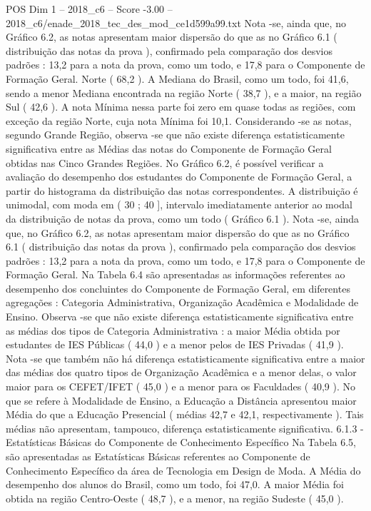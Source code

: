 \begin{textsample}{POS Dim 1 – 2018\_c6 – Score -3.00 – 2018\_c6/enade\_2018\_tec\_des\_mod\_ce1d599a99.txt}
Nota -se, ainda que, no Gráfico 6.2, as notas apresentam maior dispersão do que as no Gráfico 6.1 ( distribuição das notas da prova ), confirmado pela comparação dos desvios padrões : 13,2 para a nota da prova, como um todo, e 17,8 para o Componente de Formação Geral.
Norte ( 68,2 ).
A Mediana do Brasil, como um todo, foi 41,6, sendo a menor Mediana encontrada na região Norte ( 38,7 ), e a maior, na região Sul ( 42,6 ).
A nota Mínima nessa parte foi zero em quase todas as regiões, com exceção da região Norte, cuja nota Mínima foi 10,1.
Considerando -se as notas, segundo Grande Região, observa -se que não existe diferença estatisticamente significativa entre as Médias das notas do Componente de Formação Geral obtidas nas Cinco Grandes Regiões.
No Gráfico 6.2, é possível verificar a avaliação do desempenho dos estudantes do Componente de Formação Geral, a partir do histograma da distribuição das notas correspondentes.
A distribuição é unimodal, com moda em ( 30 ; 40 ], intervalo imediatamente anterior ao modal da distribuição de notas da prova, como um todo ( Gráfico 6.1 ).
Nota -se, ainda que, no Gráfico 6.2, as notas apresentam maior dispersão do que as no Gráfico 6.1 ( distribuição das notas da prova ), confirmado pela comparação dos desvios padrões : 13,2 para a nota da prova, como um todo, e 17,8 para o Componente de Formação Geral.
Na Tabela 6.4 são apresentadas as informações referentes ao desempenho dos concluintes do Componente de Formação Geral, em diferentes agregações : Categoria Administrativa, Organização Acadêmica e Modalidade de Ensino.
Observa -se que não existe diferença estatisticamente significativa entre as médias dos tipos de Categoria Administrativa : a maior Média obtida por estudantes de IES Públicas ( 44,0 ) e a menor pelos de IES Privadas ( 41,9 ).
Nota -se que também não há diferença estatisticamente significativa entre a maior das médias dos quatro tipos de Organização Acadêmica e a menor delas, o valor maior para os CEFET/IFET ( 45,0 ) e a menor para os Faculdades ( 40,9 ).
No que se refere à Modalidade de Ensino, a Educação a Distância apresentou maior Média do que a Educação Presencial ( médias 42,7 e 42,1, respectivamente ).
Tais médias não apresentam, tampouco, diferença estatisticamente significativa. 6.1.3 - Estatísticas Básicas do Componente de Conhecimento Específico Na Tabela 6.5, são apresentadas as Estatísticas Básicas referentes ao Componente de Conhecimento Específico da área de Tecnologia em Design de Moda.
A Média do desempenho dos alunos do Brasil, como um todo, foi 47,0.
A maior Média foi obtida na região Centro-Oeste ( 48,7 ), e a menor, na região Sudeste ( 45,0 ).

\end{textsample}

